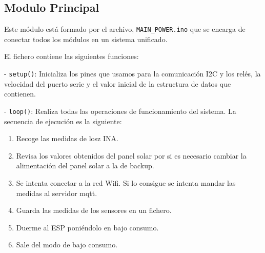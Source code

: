 \documentclass{article}
\begin{document}
\subsection{Modulo Principal}

Este módulo está formado por el archivo, \texttt{MAIN\_POWER.ino} que se encarga de conectar todos los módulos en un sistema unificado.

El fichero contiene las siguientes funciones:

- \texttt{setup()}: Inicializa los pines que usamos para la comunicación I2C y los relés, la velocidad del puerto serie y el valor inicial de la estructura de datos que contienen.

- \texttt{loop()}: Realiza todas las operaciones de funcionamiento del sistema. La secuencia de ejecución es la siguiente:
\begin{enumerate}
    \item Recoge las medidas de losz INA.
    \item Revisa los valores obtenidos del panel solar por si es necesario cambiar la alimentación del panel solar a la de backup.
    \item Se intenta conectar a la red Wifi. Si lo consigue se intenta mandar las medidas al servidor mqtt.
    \item Guarda las medidas de los sensores en un fichero.
    \item Duerme al ESP poniéndolo en bajo consumo.
    \item Sale del modo de bajo consumo.
\end{enumerate}
\end{document}
